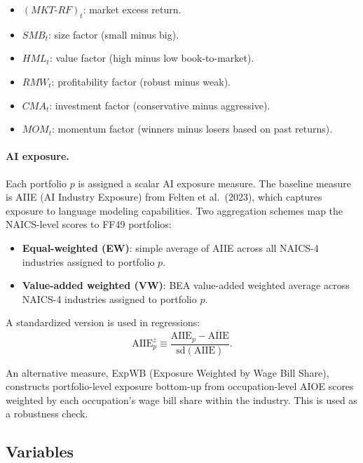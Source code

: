\documentclass[11pt]{article}
\begin{document}
\begin{itemize}[leftmargin=*]
  \item $(MKT\text{-}RF)_t$: market excess return.
  \item $SMB_t$: size factor (small minus big).
  \item $HML_t$: value factor (high minus low book-to-market).
  \item $RMW_t$: profitability factor (robust minus weak).
  \item $CMA_t$: investment factor (conservative minus aggressive).
  \item $MOM_t$: momentum factor (winners minus losers based on past returns).
\end{itemize}

\paragraph{AI exposure.}

Each portfolio $p$ is assigned a scalar AI exposure measure. The baseline measure is AIIE (AI Industry Exposure) from Felten et al.\ (2023), which captures exposure to language modeling capabilities. Two aggregation schemes map the NAICS-level scores to FF49 portfolios:

\begin{itemize}[leftmargin=*]
  \item \textbf{Equal-weighted (EW)}: simple average of AIIE across all NAICS-4 industries assigned to portfolio $p$.
  \item \textbf{Value-added weighted (VW)}: BEA value-added weighted average across NAICS-4 industries assigned to portfolio $p$.
\end{itemize}

A standardized version is used in regressions:
\begin{equation}
  \text{AIIE}^{z}_p \equiv \frac{\text{AIIE}_p - \overline{\text{AIIE}}}{\text{sd}(\text{AIIE})}.
\end{equation}

An alternative measure, ExpWB (Exposure Weighted by Wage Bill Share), constructs portfolio-level exposure bottom-up from occupation-level AIOE scores weighted by each occupation's wage bill share within the industry. This is used as a robustness check.

\subsection{Variables}
\end{document}
